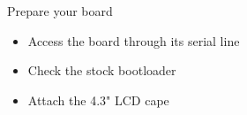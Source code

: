 {
  Prepare your board
  \begin{itemize}
  \item Access the board through its serial line
  \item Check the stock bootloader
  \item Attach the 4.3" LCD cape
  \end{itemize}
}
